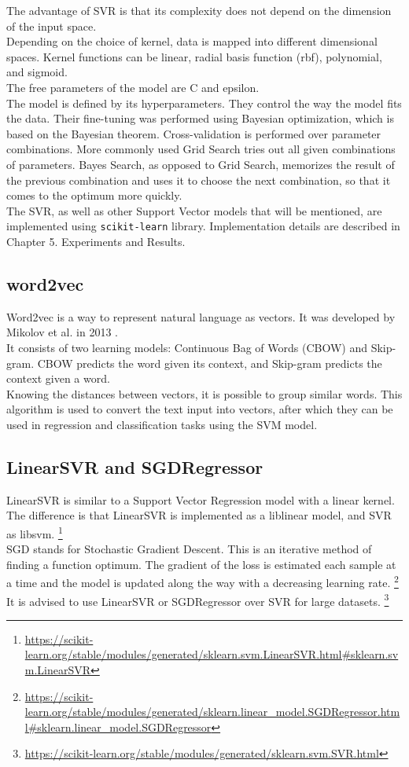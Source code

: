 \documentclass[times, utf8, zavrsni, english]{fer}
\begin{document}
\noindent The advantage of SVR is that its complexity does not depend on the dimension of the input space. \\

\noindent Depending on the choice of kernel, data is mapped into different dimensional spaces. Kernel functions can be linear, radial basis function (rbf), polynomial, and sigmoid. \\
The free parameters of the model are C and epsilon. \\
The model is defined by its hyperparameters. They control the way the model fits the data. Their fine-tuning was performed using Bayesian optimization, which is based on the Bayesian theorem. Cross-validation is performed over parameter combinations. More commonly used Grid Search tries out all given combinations of parameters. Bayes Search, as opposed to Grid Search, memorizes the result of the previous combination and uses it to choose the next combination, so that it comes to the optimum more quickly. \citep{WU201926} \\

\noindent The SVR, as well as other Support Vector models that will be mentioned, are implemented using \texttt{scikit-learn} library. Implementation details are described in Chapter 5. Experiments and Results.

\subsection{word2vec}
Word2vec is a way to represent natural language as vectors. It was developed by Mikolov et al. in 2013 \citep{mikolov}. \\
It consists of two learning models: Continuous Bag of Words (CBOW) and Skip-gram. CBOW predicts the word given its context, and Skip-gram predicts the context given a word. \citep{ma} \\
Knowing the distances between vectors, it is possible to group similar words.
This algorithm is used to convert the text input into vectors, after which they can be used in regression and classification tasks using the SVM model.
\subsection{LinearSVR and SGDRegressor}
LinearSVR is similar to a Support Vector Regression model with a linear kernel. 
The difference is that LinearSVR is implemented as a liblinear model, and SVR as libsvm. \footnote{\url{https://scikit-learn.org/stable/modules/generated/sklearn.svm.LinearSVR.html#sklearn.svm.LinearSVR}} \\
SGD stands for Stochastic Gradient Descent. This is an iterative method of finding a function optimum. The gradient of the loss is estimated each sample at a time and the model is updated along the way with a decreasing learning rate. \footnote{\url{https://scikit-learn.org/stable/modules/generated/sklearn.linear_model.SGDRegressor.html#sklearn.linear_model.SGDRegressor}} \\
It is advised to use LinearSVR or SGDRegressor over SVR for large datasets. \footnote{\url{https://scikit-learn.org/stable/modules/generated/sklearn.svm.SVR.html}}
\end{document}
